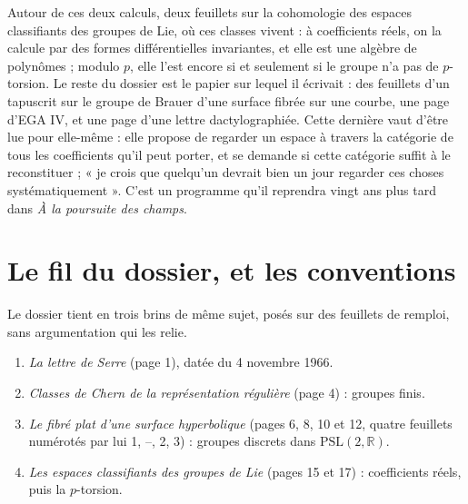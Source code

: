 \documentclass[11pt,a4paper]{article}
\begin{document}
\begin{resume}
Autour de ces deux calculs, deux feuillets sur la cohomologie des espaces
classifiants des groupes de Lie, où ces classes vivent : à coefficients
réels, on la calcule par des formes différentielles invariantes, et elle est
une algèbre de polynômes ; modulo $p$, elle l'est encore si et seulement si le
groupe n'a pas de $p$-torsion. Le reste du dossier est le papier sur lequel
il écrivait : des feuillets d'un tapuscrit sur le groupe de Brauer d'une
surface fibrée sur une courbe, une page d'EGA IV, et une page d'une lettre
dactylographiée. Cette dernière vaut d'être lue pour elle-même : elle
propose de regarder un espace à travers la
catégorie de tous les coefficients qu'il peut porter, et se demande si
cette catégorie suffit à le reconstituer ; « je crois que quelqu'un devrait
bien un jour regarder ces choses systématiquement ». C'est un programme
qu'il reprendra vingt ans plus tard dans \emph{À la poursuite des champs}.

\end{resume}

\section*{Le fil du dossier, et les conventions}

Le dossier tient en trois brins de même sujet, posés sur des feuillets de
remploi, sans argumentation qui les relie.

\begin{enumerate}
\item[1.] \emph{La lettre de Serre} (page 1), datée du 4 novembre 1966.
\item[2.] \emph{Classes de Chern de la représentation régulière} (page 4) :
groupes finis.
\item[3.] \emph{Le fibré plat d'une surface hyperbolique} (pages 6, 8, 10 et
12, quatre feuillets numérotés par lui 1, --, 2, 3) : groupes discrets dans
$\mathrm{PSL}(2,\mathbb{R})$.
\item[4.] \emph{Les espaces classifiants des groupes de Lie} (pages 15 et 17) :
coefficients réels, puis la $p$-torsion.
\end{enumerate}
\end{document}
